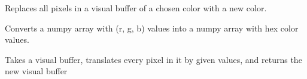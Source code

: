 \documentclass[letterpaper,10pt,english,openany,oneside]{sphinxmanual}
\begin{document}
\begin{fulllineitems}
\sphinxAtStartPar
Replaces all pixels in a visual buffer of a chosen color with a new
color.

\end{fulllineitems}



\begin{fulllineitems}
\sphinxAtStartPar
Converts a numpy array with (r, g, b) values into a numpy array with
hex color values.

\end{fulllineitems}



\begin{fulllineitems}
\sphinxAtStartPar
Takes a visual buffer, translates every pixel in it by given values, and
returns the new visual buffer

\end{fulllineitems}




\renewcommand{\indexname}{Index}
\printindex
\end{document}
